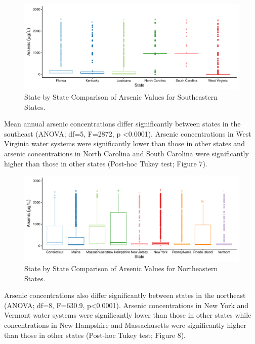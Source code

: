 \documentclass[12pt,]{article}
\begin{document}
\begin{figure}
\centering
\includegraphics{Project_Template_files/figure-latex/figs7-1.pdf}
\caption{State by State Comparison of Arsenic Values for Southeastern
States.}
\end{figure}

Mean annual arsenic concentrations differ significantly between states
in the southeast (ANOVA; df=5, F=2872, p \textless{}0.0001). Arsenic
concentrations in West Virginia water systems were significantly lower
than those in other states and arsenic concentrations in North Carolina
and South Carolina were significantly higher than those in other states
(Post-hoc Tukey test; Figure 7).

\newpage

\begin{figure}
\centering
\includegraphics{Project_Template_files/figure-latex/figs8-1.pdf}
\caption{State by State Comparison of Arsenic Values for Northeastern
States.}
\end{figure}

Arsenic concentrations also differ significantly between states in the
northeast (ANOVA; df=8, F=630.9, p\textless{}0.0001). Arsenic
concentrations in New York and Vermont water systems were significantly
lower than those in other states while concentrations in New Hampshire
and Massachusetts were significantly higher than those in other states
(Post-hoc Tukey test; Figure 8).

\newpage
\end{document}
